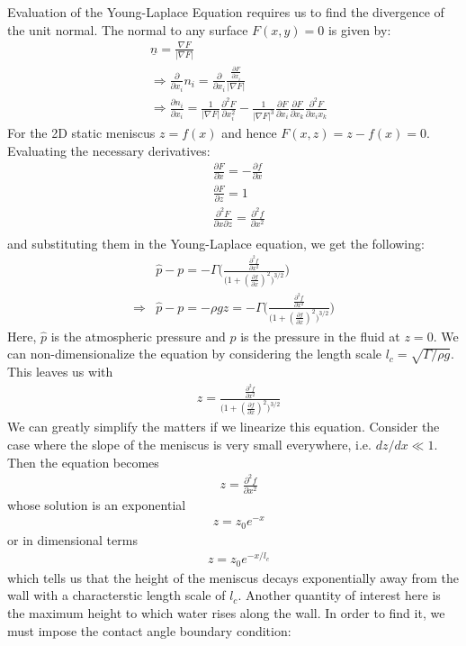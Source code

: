 \documentclass[11pt,a4paper]{article}
\newcommand{\pd}[2]{\frac{\partial #1}{\partial #2}}
\newcommand{\vect}[1]{\underline{#1}}
\newcommand{\1}{\vect{1}}
\newcommand{\grad}{\nabla}
\begin{document}
Evaluation of the Young-Laplace Equation requires us to find the divergence of the unit normal. The normal to any surface $F(x,y) = 0$ is given by:
\begin{align*}
&  \vect n = \frac{\grad F}{|\grad F|}\\
&\Rightarrow \pd{}{x_i}n_i = \pd{}{x_i}\frac{\pd{F}{x_i}}{|\grad F|}\\
&\Rightarrow \pd{n_i}{x_i} = \frac{1}{|\grad F|}\pd{^2F}{x_i^2} - \frac{1}{|\grad F|^3}\pd{F}{x_i}\pd{F}{x_k}\pd{^2F}{x_ix_k}
\end{align*}
For the 2D static meniscus $z=f(x)$ and hence $F(x,z) = z-f(x) = 0$. Evaluating the necessary derivatives:
\begin{align*}
&\pd{F}{x} = -\pd{f}{x}\\
&\pd{F}{z} = 1\\
&\pd{^2F}{x\partial z} = \pd{^2f}{x^2}\\
\end{align*}
and substituting them in the Young-Laplace equation, we get the following:
\begin{align*}
&\hat p - p = -\Gamma \bigg(\frac{\pd{^2f}{x^2}}{\big(1+(\pd{f}{x})^2\big)^{3/2}} \bigg)\\
\Rightarrow &\hat p - p = -\rho g z  = -\Gamma \bigg(\frac{\pd{^2f}{x^2}}{\big(1+(\pd{f}{x})^2\big)^{3/2}} \bigg)
\end{align*}
Here, $\hat p$ is the atmospheric pressure and $p$ is the pressure in the fluid at $z=0$. We can non-dimensionalize the equation by considering the length scale $l_c = \sqrt{\Gamma/\rho g}$. This leaves us with
\begin{align*}
& z  = \frac{\pd{^2f}{x^2}}{\big(1+(\pd{f}{x})^2\big)^{3/2}} 
\end{align*}
We can greatly simplify the matters if we linearize this equation. Consider the case where the slope of the meniscus is very small everywhere, i.e. $dz/dx \ll 1$. Then the equation becomes
\begin{align*}
& z = \pd{^2f}{x^2}
\end{align*}
whose solution is an exponential 
\begin{align*}
&z = z_0 e^{-x}
\end{align*}
or in dimensional terms
\begin{align*}
&z = z_0 e^{-x/l_c}
\end{align*}
which tells us that the height of the meniscus decays exponentially away from the wall with a characterstic length scale of $l_c$. Another quantity of interest here is the maximum height to which water rises along the wall. In order to find it, we must impose the contact angle boundary condition:
\end{document}
